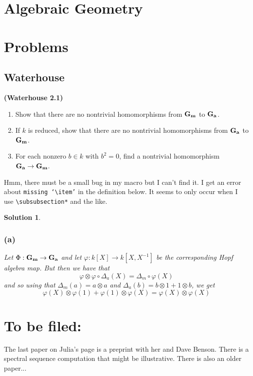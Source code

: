 \documentclass[12pt]{article}
\theoremstyle{nonumberbreak}
\newtheorem{sol}{Solution}
\theoremstyle{changebreak}
\theoremstyle{nonumberplain}
\theoremstyle{change}
\newenvironment{wprob}[1]{\begin{prob}{\normalfont\bfseries (Waterhouse #1) }\itshape}{\end{prob}}
\newcommand*{\Ga}{\ensuremath\mathbf{G_a}}
\newcommand*{\Gm}{\ensuremath\mathbf{G_m}}
\begin{document}

\newpage
\section{Algebraic Geometry}


\newpage
\section{Problems}

\subsection{Waterhouse}
\begin{wprob}{2.1}
	\begin{enumerate}
		\item Show that there are no nontrivial homomorphisms from $\Gm$ to $\Ga$.
		\item If $k$ is reduced, show that there are no nontrivial homomorphisms from $\Ga$ to $\Gm$.
		\item For each nonzero $b\in k$ with $b^2=0$, find a nontrivial homomorphism $\Ga\to\Gm$.
	\end{enumerate}
\end{wprob}
Hmm, there must be a small bug in my macro but I can't find it. I get an error about \texttt{missing `\textbackslash item'}
in the definition below. It seems to only occur when I use \texttt{\textbackslash subsubsection*} and the like.

\begin{sol}
	\subsubsection*{(a)}
	Let $\Phi:\Gm\to\Ga$ and let $\varphi:k[X]\to k[X,X^{-1}]$ be the corresponding Hopf
	algebra map. But then we have that 
	\[\varphi\otimes\varphi \circ \Delta_a(X)=\Delta_m\circ\varphi(X)\]
	and so using that $\Delta_m(a)=a\otimes a$ and $\Delta_a(b)=b\otimes1+1\otimes b$, we get
	\[\varphi(X)\otimes\varphi(1)+\varphi(1)\otimes\varphi(X)=\varphi(X)\otimes\varphi(X)\]
\end{sol}

\section{To be filed:}
The last paper on Julia's page is a preprint with her and Dave Benson. There is a spectral sequence computation that might be illustrative.
There is also an older paper...
\end{document}

